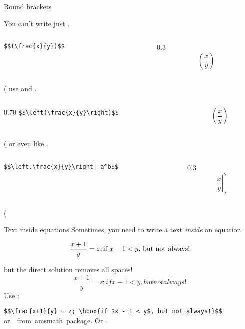 \begin{frame}[fragile]{Round brackets}\relax

You can't write just 
\vphantom. 
    \begin{columns}
        \begin{column}{0.70\textwidth}
          \hfill \lstinline[basicstyle=\tt\normalsize]"$$(\frac{x}{y})$$" 
        \end{column}
        \begin{column}{0.3\textwidth}
             $$(\frac{x}{y})$$
        \end{column}
    \end{columns}
    \vphantom(
    \inpause\inpause
use \ccol{\left} and \ccol{\right}
     \vphantom. 
    \begin{columns}
        \begin{column}{0.70\textwidth}
          \hfill \lstinline[basicstyle=\tt\normalsize]"$$\left(\frac{x}{y}\right)$$" 
        \end{column}
        \begin{column}{0.3\textwidth}
             $$\left(\frac{x}{y}\right)$$
        \end{column}
    \end{columns}
    \vphantom(
    \inpause
or even like 
\vphantom. 
    \begin{columns}
        \begin{column}{0.70\textwidth}
          \hfill \lstinline[basicstyle=\tt\normalsize]"$$\left.\frac{x}{y}\right|_a^b$$" 
        \end{column}
        \begin{column}{0.3\textwidth}
             $$\left.\frac{x}{y}\right|_a^b$$
        \end{column}
    \end{columns}
    \vphantom(
\end{frame}

\outclassframe{

}



\begin{frame}[fragile]{Text inside equations}\relax
Sometimes, you need to write a text \textit{inside} an equation

$$\frac{x+1}{y} = z; \hbox{if $x - 1 < y$, but not always!}$$

\cprotect{}
but the direct solution removes all spaces! 
$$\frac{x+1}{y} = z; if x - 1 < y, but not always!$$
\inpause
Use \ccol{\hbox}:

\lstinline[basicstyle=\tt]|$$\frac{x+1}{y} = z; \hbox{if $x - 1 < y$, but not always!}$$| \inpause \hfill or~\ccol\text~from~{\csk amsmath}~package.  Or \ccol\mbox.

\end{frame}

